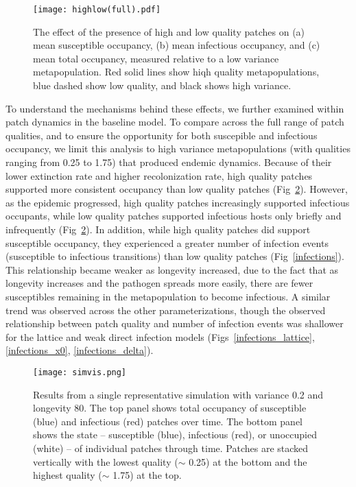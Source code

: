 \documentclass{svjour3}
\begin{document}
\begin{figure}
\centering
\texttt{[image: highlow(full).pdf]}
\caption{The effect of the presence of high and low quality patches on (a) mean susceptible occupancy, (b) mean infectious occupancy, and (c) mean total occupancy, measured relative to  a low variance metapopulation.  Red solid lines show hiqh quality metapopulations, blue dashed show low quality, and black shows high variance.}
\label{sens}
\end{figure}

To understand the mechanisms behind these effects, we further examined within patch dynamics in the baseline model.  To compare across the full range of patch qualities, and to ensure the opportunity for both suscepible and infectious occupancy, we limit this analysis to high variance metapopulations (with qualities ranging from 0.25 to 1.75) that produced endemic dynamics.  Because of their lower extinction rate and higher recolonization rate, high quality patches supported more consistent occupancy than low quality patches (Fig~\ref{simvis}).  However, as the epidemic progressed, high quality patches increasingly supported infectious occupants, while low quality patches supported infectious hosts only briefly and infrequently (Fig~\ref{simvis}).  In addition, while high quality patches did support susceptible occupancy, they experienced a greater number of infection events (susceptible to infectious transitions) than low quality patches (Fig~\ref{infections}).  This relationship became weaker as longevity increased, due to the fact that as longevity increases and the pathogen spreads more easily, there are fewer susceptibles remaining in the metapopulation to become infectious.  A similar trend was observed across the other parameterizations, though the observed relationship between patch quality and number of infection events was shallower for the lattice and weak direct infection models (Figs~\ref{infections_lattice}, \ref{infections_x0}, \ref{infections_delta}).

\begin{figure}
\centering
\texttt{[image: simvis.png]}
\caption{Results from a single representative simulation with variance 0.2 and longevity 80.  The top panel shows total occupancy of susceptible (blue) and infectious (red) patches over time.  The bottom panel shows the state -- susceptible (blue), infectious (red), or unoccupied (white) -- of individual patches through time.  Patches are stacked vertically with the lowest quality ($\sim$ 0.25) at the bottom and the highest quality ($\sim$ 1.75) at the top.}
\label{simvis}
\end{figure}
\end{document}
